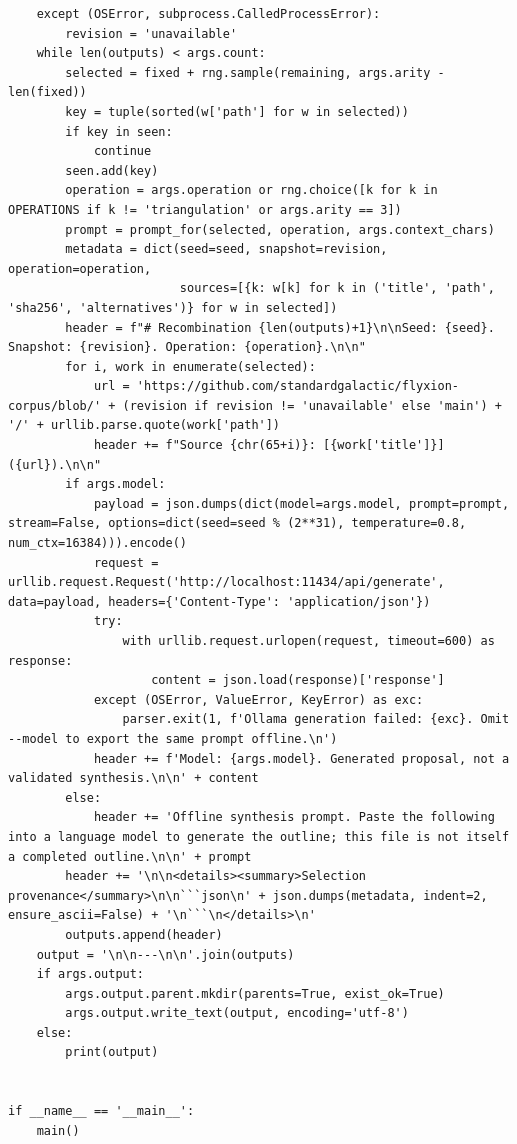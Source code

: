 \documentclass[11pt]{article}
\begin{document}
\begin{lstlisting}
    except (OSError, subprocess.CalledProcessError):
        revision = 'unavailable'
    while len(outputs) < args.count:
        selected = fixed + rng.sample(remaining, args.arity - len(fixed))
        key = tuple(sorted(w['path'] for w in selected))
        if key in seen:
            continue
        seen.add(key)
        operation = args.operation or rng.choice([k for k in OPERATIONS if k != 'triangulation' or args.arity == 3])
        prompt = prompt_for(selected, operation, args.context_chars)
        metadata = dict(seed=seed, snapshot=revision, operation=operation,
                        sources=[{k: w[k] for k in ('title', 'path', 'sha256', 'alternatives')} for w in selected])
        header = f"# Recombination {len(outputs)+1}\n\nSeed: {seed}. Snapshot: {revision}. Operation: {operation}.\n\n"
        for i, work in enumerate(selected):
            url = 'https://github.com/standardgalactic/flyxion-corpus/blob/' + (revision if revision != 'unavailable' else 'main') + '/' + urllib.parse.quote(work['path'])
            header += f"Source {chr(65+i)}: [{work['title']}]({url}).\n\n"
        if args.model:
            payload = json.dumps(dict(model=args.model, prompt=prompt, stream=False, options=dict(seed=seed % (2**31), temperature=0.8, num_ctx=16384))).encode()
            request = urllib.request.Request('http://localhost:11434/api/generate', data=payload, headers={'Content-Type': 'application/json'})
            try:
                with urllib.request.urlopen(request, timeout=600) as response:
                    content = json.load(response)['response']
            except (OSError, ValueError, KeyError) as exc:
                parser.exit(1, f'Ollama generation failed: {exc}. Omit --model to export the same prompt offline.\n')
            header += f'Model: {args.model}. Generated proposal, not a validated synthesis.\n\n' + content
        else:
            header += 'Offline synthesis prompt. Paste the following into a language model to generate the outline; this file is not itself a completed outline.\n\n' + prompt
        header += '\n\n<details><summary>Selection provenance</summary>\n\n```json\n' + json.dumps(metadata, indent=2, ensure_ascii=False) + '\n```\n</details>\n'
        outputs.append(header)
    output = '\n\n---\n\n'.join(outputs)
    if args.output:
        args.output.parent.mkdir(parents=True, exist_ok=True)
        args.output.write_text(output, encoding='utf-8')
    else:
        print(output)


if __name__ == '__main__':
    main()
\end{lstlisting}
\end{document}
